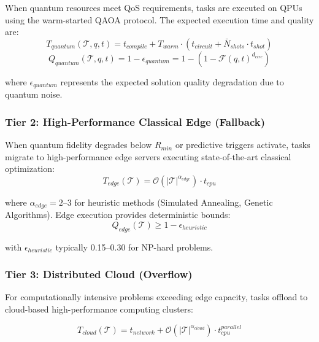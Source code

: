 \documentclass[lettersize,journal]{IEEEtran}
\begin{document}
When quantum resources meet QoS requirements, tasks are executed on QPUs using the warm-started QAOA protocol. The expected execution time and quality are:
\begin{equation}
T_{quantum}(\mathcal{T}, q, t) = t_{compile} + T_{warm} \cdot (t_{circuit} + \bar{N}_{shots} \cdot t_{shot})
\label{eq:quantum_exec_time}
\end{equation}
\begin{equation}
Q_{quantum}(\mathcal{T}, q, t) = 1 - \epsilon_{quantum} = 1 - \left(1 - \mathcal{F}(q, t)^{d_{circ}}\right)
\label{eq:quantum_quality}
\end{equation}

where $\epsilon_{quantum}$ represents the expected solution quality degradation due to quantum noise.

\subsubsection{Tier 2: High-Performance Classical Edge (Fallback)}

When quantum fidelity degrades below $R_{min}$ or predictive triggers activate, tasks migrate to high-performance edge servers executing state-of-the-art classical optimization:
\begin{equation}
T_{edge}(\mathcal{T}) = \mathcal{O}(|\mathcal{T}|^{\alpha_{edge}}) \cdot t_{cpu}
\label{eq:edge_exec_time}
\end{equation}

where $\alpha_{edge} = 2$--$3$ for heuristic methods (Simulated Annealing, Genetic Algorithms). Edge execution provides deterministic bounds:
\begin{equation}
Q_{edge}(\mathcal{T}) \geq 1 - \epsilon_{heuristic}
\label{eq:edge_quality}
\end{equation}

with $\epsilon_{heuristic}$ typically 0.15--0.30 for NP-hard problems.

\subsubsection{Tier 3: Distributed Cloud (Overflow)}

For computationally intensive problems exceeding edge capacity, tasks offload to cloud-based high-performance computing clusters:

\begin{equation}
T_{cloud}(\mathcal{T}) = t_{network} + \mathcal{O}(|\mathcal{T}|^{\alpha_{cloud}}) \cdot t_{cpu}^{parallel}
\label{eq:cloud_exec_time}
\end{equation}
\end{document}
